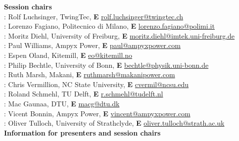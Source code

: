\textbf{\Large Session chairs}\\

: Rolf Luchsinger, TwingTec, \textbf{E} \href{mailto:rolf.luchsinger@twingtec.ch}{rolf.luchsinger@twingtec.ch} \\
: Lorenzo Fagiano, Politecnico di Milano, \textbf{E} \href{mailto:lorenzo.fagiano@polimi.it}{lorenzo.fagiano@polimi.it}\\
: Moritz Diehl, University of Freiburg, \textbf{E} \href{mailto:moritz.diehl@imtek.uni-freiburg.de}{moritz.diehl@imtek.uni-freiburg.de}\\
: Paul Williams, Ampyx Power, \textbf{E} \href{mailto:paul@ampyxpower.com}{paul@ampyxpower.com}\\
: Espen Oland, Kitemill, \textbf{E} \href{mailto:eo@kitemill.no}{eo@kitemill.no}\\
: Philip Bechtle, University of Bonn, \textbf{E} \href{mailto:bechtle@physik.uni-bonn.de}{bechtle@physik.uni-bonn.de}\\
: Ruth Marsh, Makani, \textbf{E} \href{mailto:ruthmarsh@makanipower.com}{ruthmarsh@makanipower.com}\\
: Chris Vermillion, NC State University, \textbf{E} \href{mailto:cvermil@ncsu.edu}{cvermil@ncsu.edu}\\
: Roland Schmehl, TU Delft, \textbf{E} \href{mailto:r.schmehl@tudelft.nl}{r.schmehl@tudelft.nl}\\
: Mac Gaunaa, DTU, \textbf{E} \href{mailto:macg@dtu.dk}{macg@dtu.dk}\\
: Vicent Bonnin, Ampyx Power, \textbf{E} \href{mailto:vincent@ampyxpower.com}{vincent@ampyxpower.com}\\[3pt]
: Oliver Tulloch, University of Strathclyde, \textbf{E} \href{mailto:oliver.tulloch@strath.ac.uk}{oliver.tulloch@strath.ac.uk}\\[.2cm]

\textbf{\Large Information for presenters and session chairs}\\

